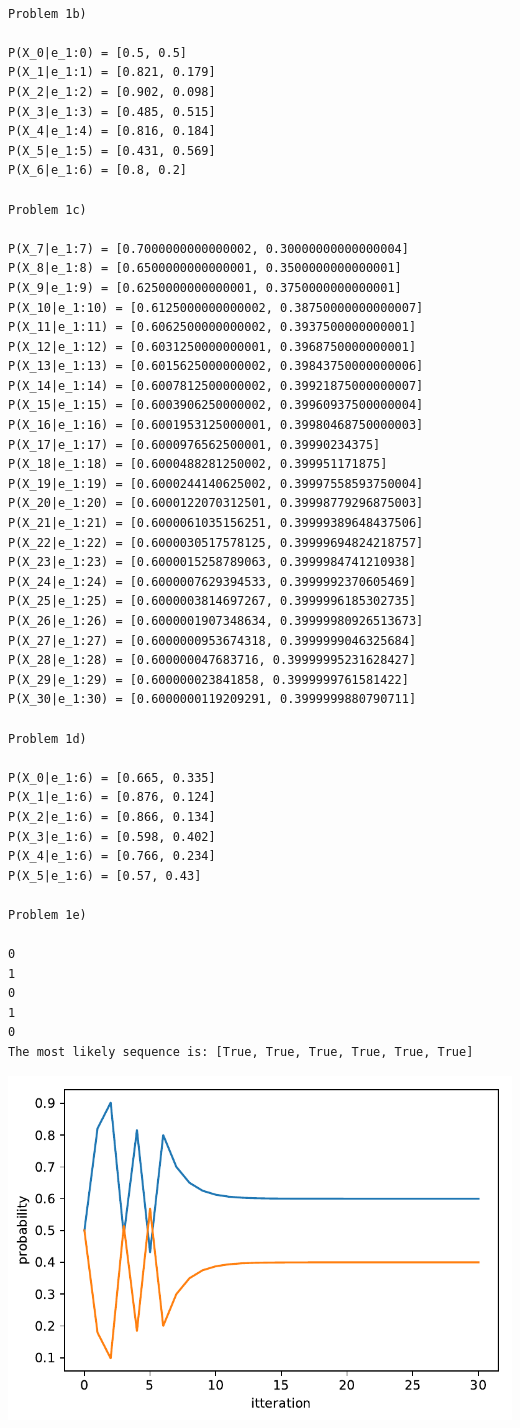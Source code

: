 \documentclass[a4paper,11pt,final]{article}
\begin{document}
\begin{Verbatim}[commandchars=\\\{\},frame=leftline,fontsize=\small, xleftmargin=0.5em]

Problem 1b)

P(X_0|e_1:0) = [0.5, 0.5]
P(X_1|e_1:1) = [0.821, 0.179]
P(X_2|e_1:2) = [0.902, 0.098]
P(X_3|e_1:3) = [0.485, 0.515]
P(X_4|e_1:4) = [0.816, 0.184]
P(X_5|e_1:5) = [0.431, 0.569]
P(X_6|e_1:6) = [0.8, 0.2]

Problem 1c)

P(X_7|e_1:7) = [0.7000000000000002, 0.30000000000000004]
P(X_8|e_1:8) = [0.6500000000000001, 0.3500000000000001]
P(X_9|e_1:9) = [0.6250000000000001, 0.3750000000000001]
P(X_10|e_1:10) = [0.6125000000000002, 0.38750000000000007]
P(X_11|e_1:11) = [0.6062500000000002, 0.3937500000000001]
P(X_12|e_1:12) = [0.6031250000000001, 0.3968750000000001]
P(X_13|e_1:13) = [0.6015625000000002, 0.39843750000000006]
P(X_14|e_1:14) = [0.6007812500000002, 0.39921875000000007]
P(X_15|e_1:15) = [0.6003906250000002, 0.39960937500000004]
P(X_16|e_1:16) = [0.6001953125000001, 0.39980468750000003]
P(X_17|e_1:17) = [0.6000976562500001, 0.39990234375]
P(X_18|e_1:18) = [0.6000488281250002, 0.399951171875]
P(X_19|e_1:19) = [0.6000244140625002, 0.39997558593750004]
P(X_20|e_1:20) = [0.6000122070312501, 0.39998779296875003]
P(X_21|e_1:21) = [0.6000061035156251, 0.39999389648437506]
P(X_22|e_1:22) = [0.6000030517578125, 0.39999694824218757]
P(X_23|e_1:23) = [0.6000015258789063, 0.3999984741210938]
P(X_24|e_1:24) = [0.6000007629394533, 0.3999992370605469]
P(X_25|e_1:25) = [0.6000003814697267, 0.3999996185302735]
P(X_26|e_1:26) = [0.6000001907348634, 0.39999980926513673]
P(X_27|e_1:27) = [0.6000000953674318, 0.3999999046325684]
P(X_28|e_1:28) = [0.600000047683716, 0.39999995231628427]
P(X_29|e_1:29) = [0.600000023841858, 0.3999999761581422]
P(X_30|e_1:30) = [0.6000000119209291, 0.3999999880790711]

Problem 1d)

P(X_0|e_1:6) = [0.665, 0.335]
P(X_1|e_1:6) = [0.876, 0.124]
P(X_2|e_1:6) = [0.866, 0.134]
P(X_3|e_1:6) = [0.598, 0.402]
P(X_4|e_1:6) = [0.766, 0.234]
P(X_5|e_1:6) = [0.57, 0.43]

Problem 1e)

0
1
0
1
0
The most likely sequence is: [True, True, True, True, True, True]
\end{Verbatim}
\includegraphics[width= \linewidth]{figures/hiddenMarkov_figure1_1.pdf}
\end{document}
